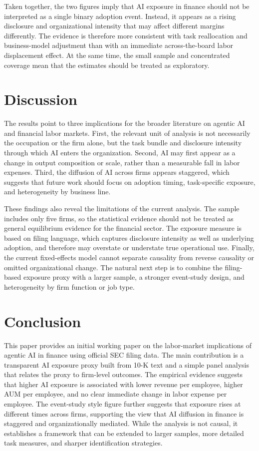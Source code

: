 \documentclass[11pt]{article}
\begin{document}
Taken together, the two figures imply that AI exposure in finance should not be interpreted as a single binary adoption event. Instead, it appears as a rising disclosure and organizational intensity that may affect different margins differently. The evidence is therefore more consistent with task reallocation and business-model adjustment than with an immediate across-the-board labor displacement effect. At the same time, the small sample and concentrated coverage mean that the estimates should be treated as exploratory.

\section{Discussion}
The results point to three implications for the broader literature on agentic AI and financial labor markets. First, the relevant unit of analysis is not necessarily the occupation or the firm alone, but the task bundle and disclosure intensity through which AI enters the organization. Second, AI may first appear as a change in output composition or scale, rather than a measurable fall in labor expenses. Third, the diffusion of AI across firms appears staggered, which suggests that future work should focus on adoption timing, task-specific exposure, and heterogeneity by business line.

These findings also reveal the limitations of the current analysis. The sample includes only five firms, so the statistical evidence should not be treated as general equilibrium evidence for the financial sector. The exposure measure is based on filing language, which captures disclosure intensity as well as underlying adoption, and therefore may overstate or understate true operational use. Finally, the current fixed-effects model cannot separate causality from reverse causality or omitted organizational change. The natural next step is to combine the filing-based exposure proxy with a larger sample, a stronger event-study design, and heterogeneity by firm function or job type.

\section{Conclusion}
This paper provides an initial working paper on the labor-market implications of agentic AI in finance using official SEC filing data. The main contribution is a transparent AI exposure proxy built from 10-K text and a simple panel analysis that relates the proxy to firm-level outcomes. The empirical evidence suggests that higher AI exposure is associated with lower revenue per employee, higher AUM per employee, and no clear immediate change in labor expense per employee. The event-study style figure further suggests that exposure rises at different times across firms, supporting the view that AI diffusion in finance is staggered and organizationally mediated. While the analysis is not causal, it establishes a framework that can be extended to larger samples, more detailed task measures, and sharper identification strategies.
\end{document}
